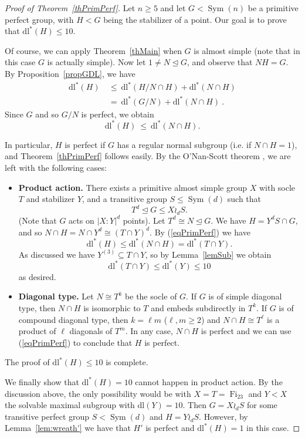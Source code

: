 \documentclass[11pt]{amsart}
\numberwithin{equation}{section}
\theoremstyle{definition}
\theoremstyle{remark}
\newcommand{\Sym}{\mathop{\mathrm{Sym}}}
\newcommand{\Fi}{\mathop{\mathrm{Fi}}}
\newcommand{\dll}{\mathrm{dl^*}}
\newcommand{\dl}{\mathrm{dl}}
\begin{document}
\begin{proof}[Proof of Theorem~\ref{thPrimPerf}]
Let $n \geq 5$ and let $G < \Sym(n)$ be a primitive perfect group,
with $H<G$ being the stabilizer of a point.
Our goal is to prove that $\dll(H) \leq 10$.

Of course, we can apply Theorem~\ref{thMain} when $G$ is almost simple
(note that in this case $G$ is actually simple).
Now let $1 \neq N \unlhd G$, and observe that $NH=G$.
By Proposition~\ref{propGDL}, we have
\begin{align*}
\dll(H)  &  \> \leq \>
\dll(H/N \cap H) + \dll(N \cap H) \\ & \> = \>
\dll(G/N) + \dll(N \cap H) \> .
\end{align*}
Since $G$ and so $G/N$ is perfect, we obtain
\begin{equation} \label{eqPrimPerf}
\dll(H) \> \leq \> \dll(N \cap H) . 
\end{equation}

In particular, $H$ is perfect if $G$ has a regular normal subgroup (i.e. if $N \cap H =1$),
and Theorem~\ref{thPrimPerf} follows easily.
By the O'Nan-Scott theorem \cite[Sec.~4]{DM96}, we are left with the following cases:

\begin{itemize}

    \item[$\bullet$] \textbf{Product action.}
    There exists a primitive almost simple group $X$ with socle $T$ and stabilizer $Y$, and a transitive group $S \leqslant \Sym(d)$ such that
    $$ T^d \unlhd G \leqslant X \wr_d S . $$
    (Note that $G$ acts on $|X:Y|^d$ points).
    Let $T^d \cong N \unlhd G$.
    We have $H = Y^d S \cap G$,
    and so $N \cap H = N \cap Y^d \cong (T \cap Y)^d$.
    By (\ref{eqPrimPerf}) we have
    $$ \dll(H) \leq \dll(N \cap H) = \dll(T \cap Y) . $$
    As discussed we have $Y^{(3)} \subseteq T \cap Y$,
    so by Lemma~\ref{lemSub} we obtain
    $$ \dll(T \cap Y) \leq \dll(Y) \leq 10 $$
    as desired.
    
    \item[$\bullet$] \textbf{Diagonal type.}
    Let $N \cong T^k$ be the socle of $G$.
    If $G$ is of simple diagonal type, then $N \cap H$ is isomorphic to $T$ and embeds subdirectly in $T^k$.
    If $G$ is of compound diagonal type, then $k= \ell m$ ($\ell,m \geq 2$) and $N \cap H \cong T^\ell$ is a product of $\ell$ diagonals of $T^m$.
    In any case, $N \cap H$ is perfect and we can use (\ref{eqPrimPerf}) to conclude that $H$ is perfect.
    
\end{itemize}

The proof of $\dll(H) \leq 10$ is complete.

We finally show that $\dll(H) =10$ cannot happen in product action. By the discussion above, the only possibility would be with $X=T=\Fi_{23}$ and $Y<X$ the solvable maximal subgroup with $\dl(Y) = 10$. Then $G=X \wr_d S$ for some transitive perfect group $S < \Sym(d)$ and $H = Y \wr_d S$. However, by Lemma~\ref{lem:wreath'} we have that $H'$ is perfect and $\dll(H) =1$ in this case.
\end{proof} 
\end{document}
